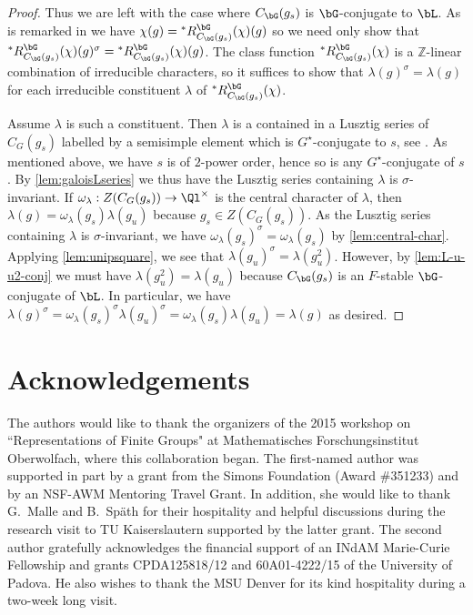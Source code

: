 \documentclass[eqthmnum, nocolour]{jt-calcs}
\begin{document}
\begin{proof}
Thus we are left with the case where $C_{\bG}(g_s)$ is $\bG$-conjugate to $\bL$. As is remarked in \cite[\S25.A]{bonnafe:2006:sln} we have $\chi(g) = {}^*R_{C_{\bG}(g_s)}^{\bG}(\chi)(g)$ so we need only show that ${}^*R_{C_{\bG}(g_s)}^{\bG}(\chi)(g)^{\sigma} = {}^*R_{C_{\bG}(g_s)}^{\bG}(\chi)(g)$. The class function ${}^*R_{C_{\bG}(g_s)}^{\bG}(\chi)$ is a $\mathbb{Z}$-linear combination of irreducible characters, so it suffices to show that $\lambda(g)^{\sigma} = \lambda(g)$ for each irreducible constituent $\lambda$ of ${}^*R_{C_{\bG}(g_s)}^{\bG}(\chi)$.

Assume $\lambda$ is such a constituent. Then $\lambda$ is a contained in a Lusztig series of $C_G(g_s)$ labelled by a semisimple element which is $G^{\star}$-conjugate to $s$, see \cite{bonnafe:2006:sln}. As mentioned above, we have $s$ is of $2$-power order, hence so is any $G^{\star}$-conjugate of $s$. By \cref{lem:galoisLseries} we thus have the Lusztig series containing $\lambda$ is $\sigma$-invariant. If $\omega_{\lambda} : Z(C_G(g_s)) \to \Ql^{\times}$ is the central character of $\lambda$, then $\lambda(g) = \omega_{\lambda}(g_s)\lambda(g_u)$ because $g_s \in Z(C_G(g_s))$. As the Lusztig series containing $\lambda$ is $\sigma$-invariant, we have $\omega_{\lambda}(g_s)^{\sigma} = \omega_{\lambda}(g_s)$ by \cref{lem:central-char}. Applying \cref{lem:unipsquare}, we see that $\lambda(g_u)^{\sigma} = \lambda(g_u^2)$.  However, by \cref{lem:L-u-u2-conj} we must have $\lambda(g_u^2) = \lambda(g_u)$ because $C_{\bG}(g_s)$ is an $F$-stable $\bG$-conjugate of $\bL$. In particular, we have $\lambda(g)^{\sigma} = \omega_{\lambda}(g_s)^{\sigma}\lambda(g_u)^{\sigma} = \omega_{\lambda}(g_s)\lambda(g_u) = \lambda(g)$ as desired.
\end{proof}

\section*{Acknowledgements}
The authors would like to thank the organizers of the 2015 workshop on ``Representations of Finite Groups" at Mathematisches Forschungsinstitut Oberwolfach, where this collaboration began.  The first-named author was supported in part by a grant from the Simons Foundation (Award \#351233) and by an NSF-AWM Mentoring Travel Grant. In addition, she would like to thank G.\ Malle and B.\ Sp{\"a}th for their hospitality and helpful discussions during the research visit to TU Kaiserslautern supported by the latter grant. The second author gratefully acknowledges the financial support of an INdAM Marie-Curie Fellowship and grants CPDA125818/12 and 60A01-4222/15 of the University of Padova. He also wishes to thank the MSU Denver for its kind hospitality during a two-week long visit.



\renewcommand*{\bibfont}{\small}
\printbibliography
\end{document}
